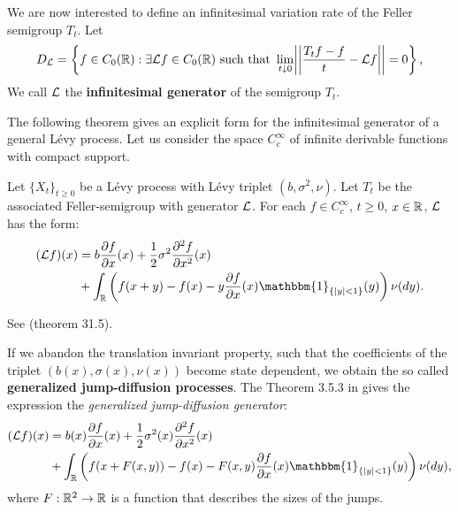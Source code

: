 \begin{Definition}
We are now interested to define an infinitesimal variation rate of the Feller semigroup $T_t$.
Let 
\begin{equation}
 D_{\mathcal{L}} = \left\{ f\in C_0(\mathbb{R}) : \exists \mathcal{L} f \in C_0(\mathbb{R}) \mbox{ such that } \lim_{t \downarrow 0} 
 \biggr|\biggr|\frac{T_t f - f}{t} -\mathcal{L} f \biggr|\biggr| = 0\right\},
\end{equation}
We call $\mathcal{L}$ the \textbf{infinitesimal generator} of the semigroup $T_t$. \\
\end{Definition}

The following theorem gives an explicit form for the infinitesimal generator 
of a general Lévy process.
Let us consider the space $C_c^{\infty}$ of infinite derivable functions with compact support.
\begin{Theorem}
 Let $\{X_t\}_{t \ge 0}$ be a Lévy process with Lévy triplet $(b,\sigma^2,\nu)$. Let $T_t$ be the associated Feller-semigroup
 with generator $\mathcal{L}$. For each $f\in C_c^{\infty}$, $t\geq0$, $x\in \mathbb{R}$, 
  $\mathcal{L}$ has the form:
 \begin{align}\label{genLevy}
  (\LL f)(x) &=  b \frac{\partial f}{\partial x}(x) +
  \frac{1}{2} \sigma^2 \frac{\partial^2 f}{\partial x^2}(x)\\  
           & + \int_{\R} \left( f(x+y) - f(x) -  y \frac{\partial f}{\partial x}(x) 
           \mathbbm{1}_{\{ |y|<1 \}}(y) \right) \nu(dy).   \nonumber
  \end{align}
\end{Theorem}
See \cite{Sato} (theorem 31.5).

If we abandon the translation invariant property, such that the coefficients of the triplet $(b(x),\sigma(x),\nu(x))$ become state dependent, 
we obtain the so called \textbf{generalized jump-diffusion processes}. 
The Theorem 3.5.3 in \cite{Applebaum} gives the expression the \emph{generalized jump-diffusion generator}:
\begin{align} \label{gen_jumpdiff}
  (\LL f)(x) &=  b(x) \frac{\partial f}{\partial x}(x) +
  \frac{1}{2} \sigma^2 (x) \frac{\partial^2 f}{\partial x^2}(x)\\  
           & + \int_{\R} \left( f(x+F(x,y)) - f(x) - F(x,y) \frac{\partial f}{\partial x}(x) 
           \mathbbm{1}_{\{ |y|<1 \}}(y) \right) \nu(dy),   \nonumber
\end{align} 
where $F:\mathbb{R}^2 \to \mathbb{R} $ is a function that describes the sizes of the jumps.
  
  
